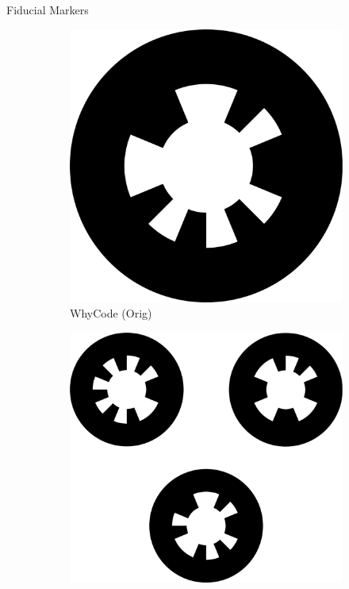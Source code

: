 \documentclass[aspectratio=169]{beamer}
\begin{document}
\begin{frame}{Fiducial Markers}
\begin{figure}[]
\begin{subfigure}[b]{0.23\linewidth}
		\includegraphics[width=\textwidth]{./images/whycode_20_8}
		    \caption{WhyCode (Orig)\cite{whycode_paper}}
		\label{figure:whycode_single}
	    \end{subfigure}
		\hspace{0.01\linewidth}
	    \begin{subfigure}[b]{0.23\linewidth}
		\includegraphics[width=\textwidth]{./images/whycode_multi}

\end{subfigure}
\end{figure}
\end{frame}
\end{document}
